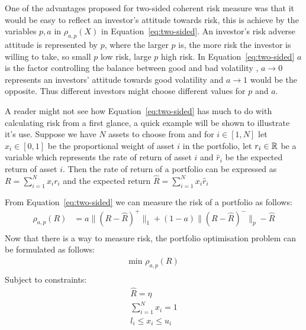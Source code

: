 \documentclass{pdfmx4020}
\begin{document}
  One of the advantages proposed for two-sided coherent risk measure was that it would be easy to reflect an investor's attitude towards risk, this is achieve by the variables $p,a$ in $\rho_{a,p}(X)$ in Equation~\ref{eq:two-sided}. An investor's risk adverse attitude is represented by $p$, where the larger $p$ is, the more risk the investor is willing to take, so small $p$ low risk, large $p$ high risk. In Equation~\ref{eq:two-sided} $a$ is the factor controlling the balance between good and bad volatility \cite{two_sided_risk}, $a \to 0$ represents an investors' attitude towards good volatility and $a \to 1$ would be the opposite. Thus different investors might choose different values for $p$ and $a$.

  A reader might not see how Equation~\ref{eq:two-sided} has much to do with calculating risk from a first glance, a quick example will be shown to illustrate it's use. Suppose we have $N$ assets to choose from and for $i \in [1,N]$ let $x_i \in [0,1]$ be the proportional weight of asset $i$ in the portfolio, let $r_i \in \mathbb{R}$ be a variable which represents the rate of return of asset $i$ and $\widehat{r}_i$ be the expected return of asset $i$. Then the rate of return of a portfolio can be expressed as $R = \sum_{i=1}^N x_i r_i$ and the expected return $\widehat{R} = \sum_{i=1}^N  x_i \widehat{r}_i$

  From Equation~\ref{eq:two-sided} we can measure the risk of a portfolio as follows:
  \begin{equation} \label{eq:portfolio-risk}
    \begin{split}
      \rho_{a,p}(R) & = a \|(R-\widehat{R})^+\|_1 + (1-a)\|(R-\widehat{R})^-\|_p - \widehat{R} \\
    \end{split}
  \end{equation} 
  Now that there is a way to measure risk, the portfolio optimisation problem can be formulated as follows:
  \begin{equation} \label{eq:portfolio-risk-min}
    \begin{split}
      \text{min } \rho_{a,p}(R) \\
    \end{split}
  \end{equation} 
  Subject to constraints:
  \begin{equation} \label{eq:portfolio-risk-constraints}
    \begin{split}
      \widehat{R} = \eta \\
      \sum\limits_{i=1}^N x_i = 1 \\
      l_i \leq x_i \leq u_i
    \end{split}
  \end{equation} 
\end{document}
